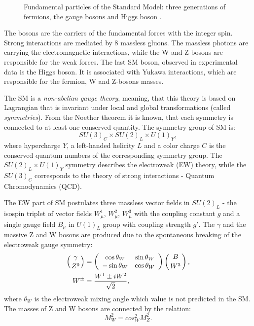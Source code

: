 \begin{figure}[!tbp]
\caption{Fundamental particles of the Standard Model: three generations of fermions, the gauge bosons and Higgs boson \cite{SMParticles}.}
\label{fig:SMPart}
\end{figure}

The bosons are the carriers of the fundamental forces with the integer spin. Strong interactions are mediated by 8 massless gluons. The massless photons are carrying the electromagnetic interactions, while the W and Z-bosons are responsible for the weak forces. The last SM boson, observed in experimental data is the Higgs boson\cite{HiggsDiscoATLAS, HiggsDiscoCMS}. It is associated with Yukawa interactions, which are responsible for the fermion, W and Z-bosons masses. 

The SM is a \textit{non-abelian gauge theory}, meaning, that this theory is based on Lagrangian that is invariant under local and global transformations (called \textit{symmetries}). From the Noether theorem\cite{Noether1, Noether2} it is known, that each symmetry is connected to at least one conserved quantity. The symmetry group of SM is:
\begin{equation}
SU(3)_C \times SU(2)_L \times U(1)_Y,
\end{equation}
where hypercharge $Y$,  a left-handed helicity $L$ and  a color charge $C$ is the conserved quantum numbers of the corresponding symmetry group. The  $SU(2)_L \times U(1)_Y$ symmetry describes the electroweak (EW) theory, while the $SU(3)_C$ corresponds to the theory of strong interactions - Quantum Chromodynamics (QCD)\cite{QCD1, QCD2, QCD3}. 

The EW part of SM postulates three massless vector fields in $SU(2)_L$ - the isospin triplet of vector fields $W^1_\mu$, $W^2_\mu$, $W^3_\mu$ with the coupling constant $g$ and a single gauge field $B_\mu$ in $U(1)_L$ group with coupling strength $g'$. The $\gamma$ and the massive Z and W bosons are produced due to the spontaneous breaking of the electroweak gauge symmetry:
        \begin{align}
                \left(\gamma \atop Z^0 \right)
                &= \left(
            \begin{array}{cc}
            \cos \theta_W & \sin \theta_W \\
            -\sin \theta_W & \cos \theta_W
            \end{array}
            \right)
                \left(B \atop W^3 \right),
                 \\
                 W^\pm& = \frac{W^1 \pm i W^2}{\sqrt{2}},
        \end{align}
where  $\theta_W$ is the electroweak mixing angle which value is not predicted in the SM. The masses of Z and W bosons are connected by the relation:
\begin{equation}
M^2_W=cos^2_W M^2_Z.
\end{equation}


